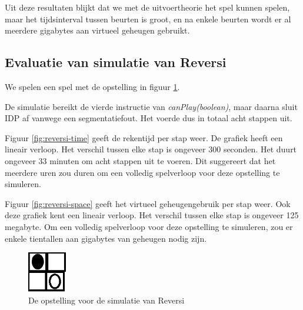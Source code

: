 Uit deze resultaten blijkt dat we met de uitvoertheorie het spel kunnen spelen, maar het tijdsinterval tussen beurten is groot, en na enkele beurten wordt er al meerdere gigabytes aan virtueel geheugen gebruikt.

\subsection{Evaluatie van simulatie van Reversi}

We spelen een spel met de opstelling in figuur \ref{fig:reversigrid}.

De simulatie bereikt de vierde instructie van \textit{canPlay(boolean)}, maar daarna sluit IDP af vanwege een segmentatiefout. Het voerde dus in totaal acht stappen uit.

Figuur \ref{fig:reversi-time} geeft de rekentijd per stap weer. De grafiek heeft een lineair verloop. Het verschil tussen elke stap is ongeveer 300 seconden. Het duurt ongeveer 33 minuten om acht stappen uit te voeren. Dit suggereert dat het meerdere uren zou duren om een volledig spelverloop voor deze opstelling te simuleren.

Figuur \ref{fig:reversi-space} geeft het virtueel geheugengebruik per stap weer. Ook deze grafiek kent een lineair verloop. Het verschil tussen elke stap is ongeveer 125 megabyte. Om een volledig spelverloop voor deze opstelling te simuleren, zou er enkele tientallen aan gigabytes van geheugen nodig zijn.

\begin{figure}
	\centering
	\includegraphics[width=0.15\textwidth]{chap-evaluatie/reversigrid.png}
	\caption{De opstelling voor de simulatie van Reversi}
	\label{fig:reversigrid}
\end{figure}

